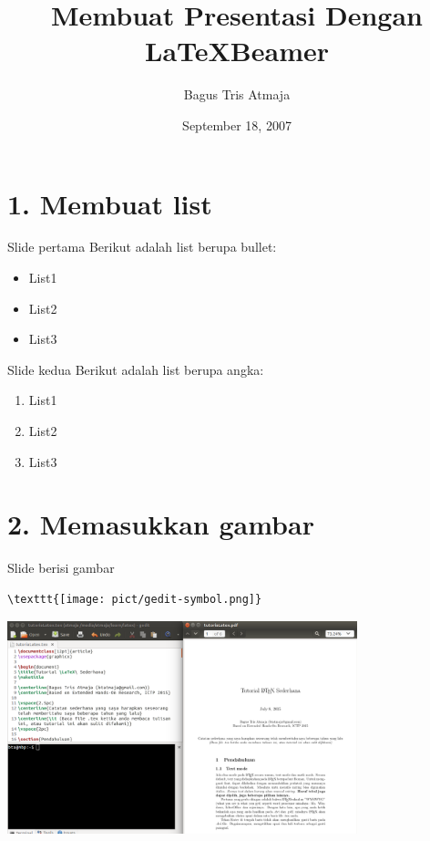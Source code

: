 \documentclass{beamer}
\author{Bagus Tris Atmaja}
\title{Membuat Presentasi Dengan \LaTeX Beamer}
\institute{Institut Teknologi Sepuluh Nopember}
\date{September 18, 2007}
\begin{document}
\begin{frame}[t,plain]
\titlepage
\end{frame}

	
\section {1. Membuat list}
\begin{frame}[t, fragile]{Slide pertama}
Berikut adalah list berupa bullet:
\begin{itemize}
\item List1
\item List2
\item List3
\end{itemize}
\end{frame}


\begin{frame}[t, fragile]{Slide kedua}
Berikut adalah list berupa angka:
\begin{enumerate}
\item List1
\item List2
\item List3
\end{enumerate}
\end{frame}

\section{2. Memasukkan gambar}
\begin{frame}[t, fragile]{Slide berisi gambar}
\begin{verbatim}
\texttt{[image: pict/gedit-symbol.png]}
\end{verbatim}
\includegraphics[width=4in]{pict/gedit-latex.png}
\end{frame}
\end{document}
